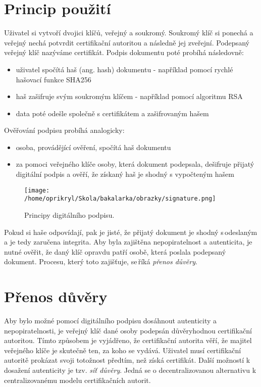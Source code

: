 \documentclass[]{fithesis3}
\begin{document}
\section{Princip použití}
Uživatel si vytvoří dvojici klíčů, veřejný a soukromý. Soukromý klíč si ponechá a veřejný nechá potvrdit certifikační autoritou a následně jej zveřejní. Podepsaný veřejný klíč nazýváme certifikát. Podpis dokumentu poté probíhá následovně:
\begin{itemize}
\item uživatel spočítá haš (ang. hash) dokumentu - například pomocí rychlé hašovací funkce SHA256
\item haš zašifruje svým soukromým klíčem - například pomocí algoritmu RSA
\item data poté odešle společně s certifikátem a zašifrovaným hašem
\end{itemize}
Ověřování podpisu probíhá analogicky:
\begin{itemize}
\item osoba, provádějící ověření, spočítá haš dokumentu
\item za pomoci veřejného klíče osoby, která dokument podepsala, dešifruje přijatý digitální podpis a ověří, že získaný haš je shodný s vypočteným hašem
\end{itemize}
\begin{figure}[!ht]
  	\begin{minipage}{1.00\textwidth}
    		\texttt{[image: /home/oprikryl/Skola/bakalarka/obrazky/signature.png]}
  	\end{minipage}
 	\caption{Principy digitálního podpisu.}
  	\label{fig:Digitální podpis.}
\end{figure}
Pokud si haše odpovídají, pak je jisté, že přijatý dokument je shodný s\,odeslaným a je tedy zaručena integrita. Aby byla zajištěna nepopiratelnost a autenticita, je nutné ověřit, že daný klíč opravdu patří osobě, která poslala podepsaný dokument. Procesu, který toto zajišťuje, se\,říká \textit{přenos důvěry}.

\section{Přenos důvěry}
Aby bylo možné pomocí digitálního podpisu dosáhnout autenticity a\,nepopiratelnosti, je veřejný klíč dané osoby podepsán důvěryhodnou certifikační autoritou. Tímto způsobem je vyjádřeno, že certifikační autorita věří, že majitel veřejného klíče je skutečně ten, za koho se vydává. Uživatel musí certifikační autoritě prokázat svoji totožnost předtím, než získá certifikát.
Další možností k dosažení autenticity je tzv. \textit{síť důvěry}. Jedná se o decentralizovanou alternativu k centralizovanému modelu certifikačních autorit. 
\end{document}
